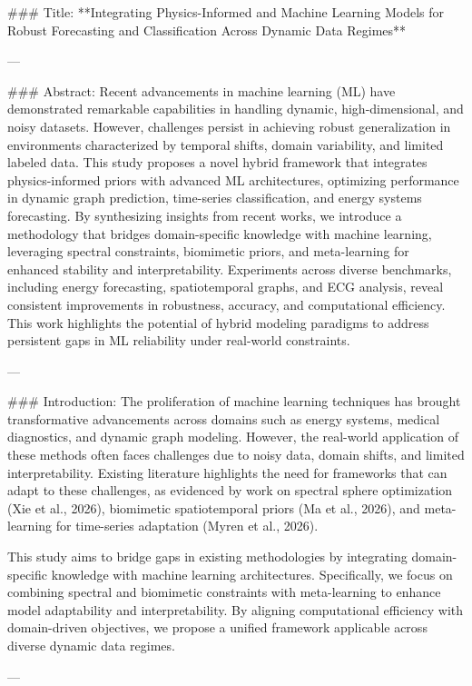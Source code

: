 ### Title:
**Integrating Physics-Informed and Machine Learning Models for Robust Forecasting and Classification Across Dynamic Data Regimes**

---

### Abstract:
Recent advancements in machine learning (ML) have demonstrated remarkable capabilities in handling dynamic, high-dimensional, and noisy datasets. However, challenges persist in achieving robust generalization in environments characterized by temporal shifts, domain variability, and limited labeled data. This study proposes a novel hybrid framework that integrates physics-informed priors with advanced ML architectures, optimizing performance in dynamic graph prediction, time-series classification, and energy systems forecasting. By synthesizing insights from recent works, we introduce a methodology that bridges domain-specific knowledge with machine learning, leveraging spectral constraints, biomimetic priors, and meta-learning for enhanced stability and interpretability. Experiments across diverse benchmarks, including energy forecasting, spatiotemporal graphs, and ECG analysis, reveal consistent improvements in robustness, accuracy, and computational efficiency. This work highlights the potential of hybrid modeling paradigms to address persistent gaps in ML reliability under real-world constraints.

---

### Introduction:
The proliferation of machine learning techniques has brought transformative advancements across domains such as energy systems, medical diagnostics, and dynamic graph modeling. However, the real-world application of these methods often faces challenges due to noisy data, domain shifts, and limited interpretability. Existing literature highlights the need for frameworks that can adapt to these challenges, as evidenced by work on spectral sphere optimization (Xie et al., 2026), biomimetic spatiotemporal priors (Ma et al., 2026), and meta-learning for time-series adaptation (Myren et al., 2026).

This study aims to bridge gaps in existing methodologies by integrating domain-specific knowledge with machine learning architectures. Specifically, we focus on combining spectral and biomimetic constraints with meta-learning to enhance model adaptability and interpretability. By aligning computational efficiency with domain-driven objectives, we propose a unified framework applicable across diverse dynamic data regimes. 

---

